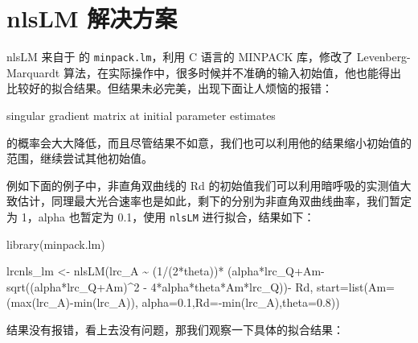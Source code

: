 \documentclass[
]{krantz}
\makeatletter
\newenvironment{Shaded}{\begin{snugshade}}{\end{snugshade}}
\newcommand{\AttributeTok}[1]{\textcolor[rgb]{0.77,0.63,0.00}{#1}}
\newcommand{\DecValTok}[1]{\textcolor[rgb]{0.00,0.00,0.81}{#1}}
\newcommand{\FloatTok}[1]{\textcolor[rgb]{0.00,0.00,0.81}{#1}}
\newcommand{\FunctionTok}[1]{\textcolor[rgb]{0.00,0.00,0.00}{#1}}
\newcommand{\NormalTok}[1]{#1}
\newcommand{\OtherTok}[1]{\textcolor[rgb]{0.56,0.35,0.01}{#1}}
\newcommand{\SpecialCharTok}[1]{\textcolor[rgb]{0.00,0.00,0.00}{#1}}
\renewenvironment{quote}{\begin{VF}}{\end{VF}}
\newenvironment{kframe}{%
\medskip{}
\setlength{\fboxsep}{.8em}
 \def\at@end@of@kframe{}%
 \ifinner\ifhmode%
  \def\at@end@of@kframe{\end{minipage}}%
  \begin{minipage}{\columnwidth}%
 \fi\fi%
 \def\FrameCommand##1{\hskip\@totalleftmargin \hskip-\fboxsep
 \colorbox{shadecolor}{##1}\hskip-\fboxsep
     \hskip-\linewidth \hskip-\@totalleftmargin \hskip\columnwidth}%
 \MakeFramed {\advance\hsize-\width
   \@totalleftmargin\z@ \linewidth\hsize
   \@setminipage}}%
 {\par\unskip\endMakeFramed%
 \at@end@of@kframe}
\renewenvironment{Shaded}{\begin{kframe}}{\end{kframe}}
\makeatother
\begin{document}
\hypertarget{nlslm}{%
\section{nlsLM 解决方案}\label{nlslm}}

nlsLM 来自于 \citet{Elzhov2016minpack} 的 \texttt{minpack.lm}，利用 C 语言的 MINPACK 库，修改了 Levenberg-Marquardt 算法，在实际操作中，很多时候并不准确的输入初始值，他也能得出比较好的拟合结果。但结果未必完美，出现下面让人烦恼的报错：

\begin{quote}
singular gradient matrix at initial parameter estimates
\end{quote}

的概率会大大降低，而且尽管结果不如意，我们也可以利用他的结果缩小初始值的范围，继续尝试其他初始值。

例如下面的例子中，非直角双曲线的 Rd 的初始值我们可以利用暗呼吸的实测值大致估计，同理最大光合速率也是如此，剩下的分别为非直角双曲线曲率，我们暂定为 1，alpha 也暂定为 0.1，使用 \texttt{nlsLM} 进行拟合，结果如下：

\begin{Shaded}
\begin{Highlighting}[]
\FunctionTok{library}\NormalTok{(minpack.lm)}

\NormalTok{lrcnls\_lm }\OtherTok{\textless{}{-}} \FunctionTok{nlsLM}\NormalTok{(lrc\_A }\SpecialCharTok{\textasciitilde{}}\NormalTok{ (}\DecValTok{1}\SpecialCharTok{/}\NormalTok{(}\DecValTok{2}\SpecialCharTok{*}\NormalTok{theta))}\SpecialCharTok{*}
\NormalTok{        (alpha}\SpecialCharTok{*}\NormalTok{lrc\_Q}\SpecialCharTok{+}\NormalTok{Am}\SpecialCharTok{{-}}\FunctionTok{sqrt}\NormalTok{((alpha}\SpecialCharTok{*}\NormalTok{lrc\_Q}\SpecialCharTok{+}\NormalTok{Am)}\SpecialCharTok{\^{}}\DecValTok{2} \SpecialCharTok{{-}} 
        \DecValTok{4}\SpecialCharTok{*}\NormalTok{alpha}\SpecialCharTok{*}\NormalTok{theta}\SpecialCharTok{*}\NormalTok{Am}\SpecialCharTok{*}\NormalTok{lrc\_Q))}\SpecialCharTok{{-}} 
\NormalTok{        Rd, }\AttributeTok{start=}\FunctionTok{list}\NormalTok{(}\AttributeTok{Am=}\NormalTok{(}\FunctionTok{max}\NormalTok{(lrc\_A)}\SpecialCharTok{{-}}\FunctionTok{min}\NormalTok{(lrc\_A)),}
        \AttributeTok{alpha=}\FloatTok{0.1}\NormalTok{,}\AttributeTok{Rd=}\SpecialCharTok{{-}}\FunctionTok{min}\NormalTok{(lrc\_A),}\AttributeTok{theta=}\FloatTok{0.8}\NormalTok{)) }
\end{Highlighting}
\end{Shaded}

结果没有报错，看上去没有问题，那我们观察一下具体的拟合结果：
\end{document}
